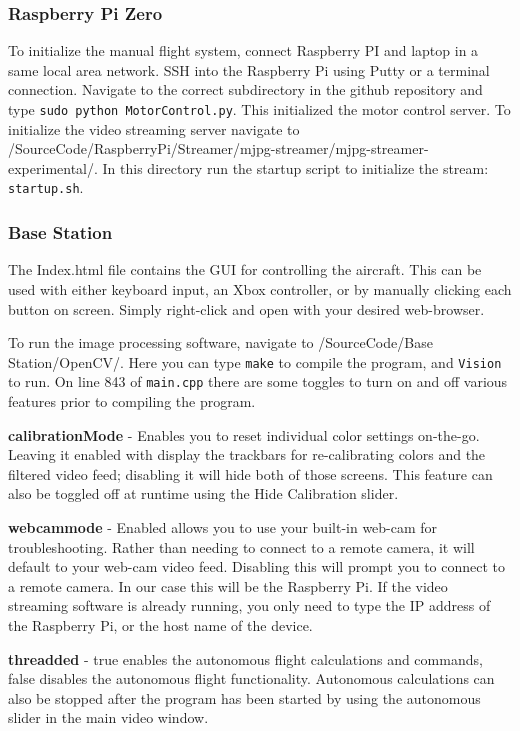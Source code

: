\documentclass[onecolumn, draftclsnofoot,10pt, compsoc]{IEEEtran}
\begin{document}
\subsubsection{Raspberry Pi Zero}

To initialize the manual flight system, connect Raspberry PI and laptop in a same local area network. SSH into the Raspberry Pi using Putty or a terminal connection. Navigate to the correct subdirectory in the github repository and type \texttt{sudo python MotorControl.py}. This initialized the motor control server. To initialize the video streaming server navigate to /SourceCode/RaspberryPi/Streamer/mjpg-streamer/mjpg-streamer-experimental/. In this directory run the startup script to initialize the stream: \texttt{startup.sh}.


\subsubsection{Base Station}

The Index.html file contains the GUI for controlling the aircraft. This can be used with either keyboard input, an Xbox controller, or by manually clicking each button on screen. Simply right-click and open with your desired web-browser. 


To run the image processing software, navigate to /SourceCode/Base Station/OpenCV/. Here you can type \texttt{make} to compile the program, and \texttt{Vision} to run. On line 843 of \texttt{main.cpp} there are some toggles to turn on and off various features prior to compiling the program. 
\begin{description}
\item{\textbf{calibrationMode}} - Enables you to reset individual color settings on-the-go. Leaving it enabled with display the trackbars for re-calibrating colors and the filtered video feed; disabling it will hide both of those screens. This feature can also be toggled off at runtime using the Hide Calibration slider.
\item{\textbf{webcammode}} - Enabled allows you to use your built-in web-cam for troubleshooting. Rather than needing to connect to a remote camera, it will default to your web-cam video feed. Disabling this will prompt you to connect to a remote camera. In our case this will be the Raspberry Pi. If the video streaming software is already running, you only need to type the IP address of the Raspberry Pi, or the host name of the device.
\item{\textbf{threadded}} - true enables the autonomous flight calculations and commands, false disables the autonomous flight functionality. Autonomous calculations can also be stopped after the program has been started by using the autonomous slider in the main video window. 
\end{description}
\end{document}
